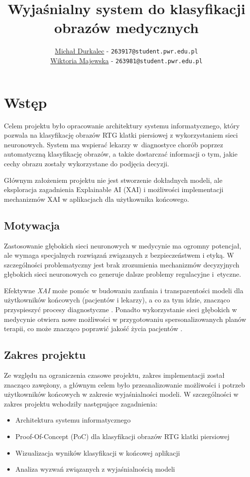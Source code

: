 \documentclass{article}
\title{Wyjaśnialny system do klasyfikacji obrazów medycznych}
\author{\href{mailto:263917@student.pwr.edu.pl}{Michał Durkalec} - \texttt{263917@student.pwr.edu.pl}\\ 
        \href{mailto:263981@student.pwr.edu.pl}{Wiktoria Majewska} - \texttt{263981@student.pwr.edu.pl}}
\date{\vspace{-5ex}} %
\begin{document}
\maketitle
\thispagestyle{firstpage}
\pagestyle{firstpage}

\section{Wstęp}
Celem projektu było opracowanie architektury systemu informatycznego, który pozwala na klasyfikację obrazów RTG klatki piersiowej z wykorzystaniem sieci neuronowych.
System ma wspierać lekarzy w~diagnostyce chorób poprzez automatyczną klasyfikację obrazów, a także dostarczać informacji o tym, jakie cechy obrazu zostały wykorzystane do podjęcia decyzji.

Głównym założeniem projektu nie jest stworzenie dokładnych modeli, ale eksploracja zagadnienia Explainable AI (XAI) \cite{gunning2019xai,barredoarrieta2020explainable} i możliwości implementacji mechanizmów XAI w aplikacjach dla użytkownika końcowego.

\subsection{Motywacja}
Zastosowanie głębokich sieci neuronowych w medycynie ma ogromny potencjał, ale wymaga specjalnych rozwiązań związanych z bezpieczeństwem i etyką.
W szczególności problematyczny jest brak zrozumienia mechanizmów decyzyjnych głębokich sieci neuronowych co generuje dalsze problemy regulacyjne i~etyczne. \cite{challen2019artificial}

Efektywne \emph{XAI} może pomóc w budowaniu zaufania i transparentości modeli dla użytkowników końcowych (pacjentów i lekarzy),
a co za tym idzie, znacząco przyspieszyć procesy diagnostyczne \cite{amann2020explainability}.
Ponadto wykorzystanie sieci głębokich w medycynie otwiera nowe możliwości w przygotowaniu spersonalizowanych planów terapii,
co może znacząco poprawić jakość życia pacjentów \cite{allen2024promise}.

\subsection{Zakres projektu}
Ze względu na ograniczenia czasowe projektu, zakres implementacji został znacząco zawężony, a głównym celem było przeanalizowanie możliwości i potrzeb użytkowników końcowych w zakresie wyjaśnialności modeli.
W szczególności w zakres projektu wchodziły następujące zagadnienia:
\begin{itemize}
  \item Architektura systemu informatycznego
  \item Proof-Of-Concept (PoC) dla klasyfikacji obrazów RTG klatki piersiowej
  \item Wizualizacja wyników klasyfikacji w końcowej aplikacji
  \item Analiza wyzwań związanych z wyjaśnialnością modeli
\end{itemize}
\end{document}
